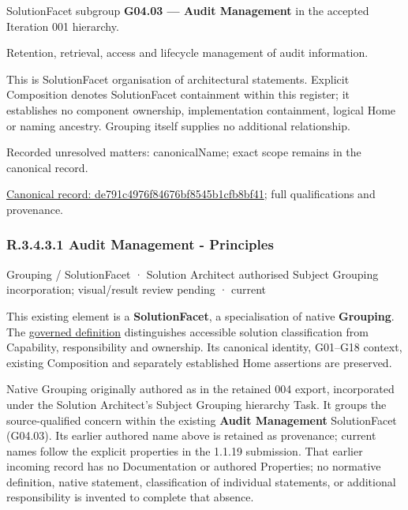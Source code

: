 SolutionFacet subgroup \textbf{G04.03 — Audit Management} in the accepted Iteration 001 hierarchy.



Retention, retrieval, access and lifecycle management of audit information.



This is SolutionFacet organisation of architectural statements. Explicit Composition denotes SolutionFacet containment within this register; it establishes no component ownership, implementation containment, logical Home or naming ancestry. Grouping itself supplies no additional relationship.


{\small Recorded unresolved matters: canonicalName; exact scope remains in the canonical record.}\par
{\footnotesize \href{../../../../../../../continuum/grouping/de791c4976f84676bf8545b1cfb8bf41.md}{Canonical record: de791c4976f84676bf8545b1cfb8bf41}; full qualifications and provenance.}\par
\subsubsection*{R.3.4.3.1 Audit Management - Principles}
\label{navigation:R.3.4.3.1}

\label{element:9c613c6963e9451e945d3934a20bdd53}
{\small Grouping / SolutionFacet · Solution Architect authorised Subject Grouping incorporation; visual/result review pending · current}\par

This existing element is a \textbf{SolutionFacet}, a specialisation of native
\textbf{Grouping}. The \href{\detokenize{../../../../../../../governance/continuum-representation.md#solutionfacet-classification--1119-candidate}}{governed definition}
distinguishes accessible solution classification from Capability, responsibility
and ownership. Its canonical identity, G01–G18 context, existing Composition
and separately established Home assertions are preserved.



Native Grouping originally authored as \texttt{} in the retained 004 export,
incorporated under the Solution Architect's Subject Grouping hierarchy Task.
It groups the source-qualified \texttt{} concern within
the existing \textbf{Audit Management} SolutionFacet (G04.03). Its earlier authored name above is retained as provenance; current names
follow the explicit properties in the 1.1.19 submission.
That earlier incoming record has no Documentation or authored Properties; no normative
definition, native statement, classification of individual statements, or
additional responsibility is invented to complete that absence.



